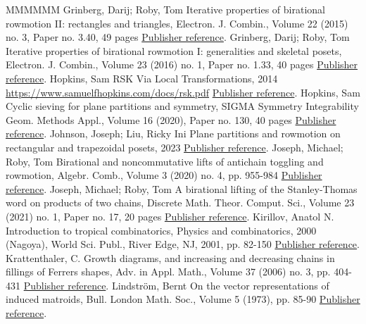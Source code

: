 \documentclass[11pt]{article}
\theoremstyle{definition}
\numberwithin{equation}{section}
\numberwithin{equation}{section}
\begin{document}
\begin{thebibliography}{MMMMMM}
 Grinberg, Darij; Roby, Tom Iterative properties of birational rowmotion II: rectangles and triangles, Electron. J. Combin., Volume 22 (2015) no. 3, Paper no. 3.40, 49 pages \href{https://alco.centre-mersenne.org/articles/10.5802/alco.385/#grinbergroby2}{Publisher reference}.
 Grinberg, Darij; Roby, Tom Iterative properties of birational rowmotion I: generalities and skeletal posets, Electron. J. Combin., Volume 23 (2016) no. 1, Paper no. 1.33, 40 pages \href{https://alco.centre-mersenne.org/articles/10.5802/alco.385/#grinbergroby1}{Publisher reference}.
 Hopkins, Sam RSK Via Local Transformations, 2014 \url{https://www.samuelfhopkins.com/docs/rsk.pdf} \href{https://alco.centre-mersenne.org/articles/10.5802/alco.385/#hopkins}{Publisher reference}.
 Hopkins, Sam Cyclic sieving for plane partitions and symmetry, SIGMA Symmetry Integrability Geom. Methods Appl., Volume 16 (2020), Paper no. 130, 40 pages \href{https://alco.centre-mersenne.org/articles/10.5802/alco.385/#hopkins3}{Publisher reference}.
 Johnson, Joseph; Liu, Ricky Ini Plane partitions and rowmotion on rectangular and trapezoidal posets, 2023 \href{https://alco.centre-mersenne.org/articles/10.5802/alco.385/#johnsonliu3}{Publisher reference}.
 Joseph, Michael; Roby, Tom Birational and noncommutative lifts of antichain toggling and rowmotion, Algebr. Comb., Volume 3 (2020) no. 4, pp. 955-984 \href{https://alco.centre-mersenne.org/articles/10.5802/alco.385/#josephroby2}{Publisher reference}.
 Joseph, Michael; Roby, Tom A birational lifting of the Stanley-Thomas word on products of two chains, Discrete Math. Theor. Comput. Sci., Volume 23 (2021) no. 1, Paper no. 17, 20 pages \href{https://alco.centre-mersenne.org/articles/10.5802/alco.385/#josephroby1}{Publisher reference}.
 Kirillov, Anatol N. Introduction to tropical combinatorics, Physics and combinatorics, 2000 (Nagoya), World Sci. Publ., River Edge, NJ, 2001, pp. 82-150 \href{https://alco.centre-mersenne.org/articles/10.5802/alco.385/#kirillov}{Publisher reference}.
 Krattenthaler, C. Growth diagrams, and increasing and decreasing chains in fillings of Ferrers shapes, Adv. in Appl. Math., Volume 37 (2006) no. 3, pp. 404-431 \href{https://alco.centre-mersenne.org/articles/10.5802/alco.385/#krattenthaler}{Publisher reference}.
 Lindström, Bernt On the vector representations of induced matroids, Bull. London Math. Soc., Volume 5 (1973), pp. 85-90 \href{https://alco.centre-mersenne.org/articles/10.5802/alco.385/#lindstrom}{Publisher reference}.

\end{thebibliography}
\end{document}
